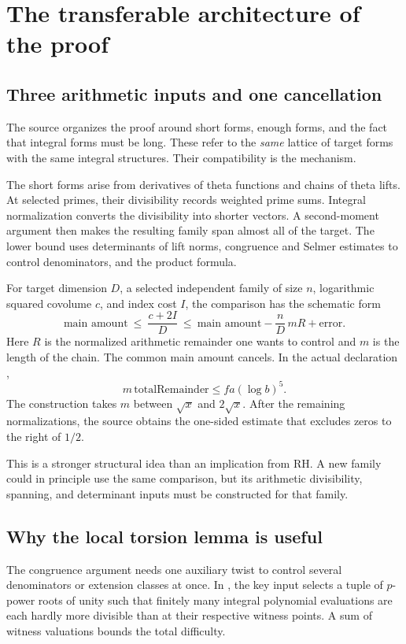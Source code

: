 \section{The transferable architecture of the proof}
\label{sec:method}

\subsection{Three arithmetic inputs and one cancellation}
The source  organizes the proof around short forms, enough forms, and the fact that integral forms must be long. These refer to the \emph{same} lattice of target forms with the same integral structures. Their compatibility is the mechanism.

The short forms arise from derivatives of theta functions and chains of theta lifts. At selected primes, their divisibility records weighted prime sums. Integral normalization converts the divisibility into shorter vectors. A second-moment argument then makes the resulting family span almost all of the target. The lower bound uses determinants of lift norms, congruence and Selmer estimates to control denominators, and the product formula.

For target dimension $D$, a selected independent family of size $n$, logarithmic squared covolume $c$, and index cost $I$, the comparison has the schematic form
\[
 \text{main amount}
 \ \le\ \frac{c+2I}{D}
 \ \le\ \text{main amount}-\frac nD\,mR+\text{error}.
\]
Here $R$ is the normalized arithmetic remainder one wants to control and $m$ is the length of the chain. The common main amount cancels. In the actual declaration
,
\[
 m\,\mathrm{totalRemainder}\le f a(\log b)^5.
\]
The construction takes $m$ between $\sqrt x$ and $2\sqrt x$. After the remaining normalizations, the source obtains the one-sided estimate that excludes zeros to the right of $1/2$.

This is a stronger structural idea than an implication from RH. A new family could in principle use the same comparison, but its arithmetic divisibility, spanning, and determinant inputs must be constructed for that family.

\subsection{Why the local torsion lemma is useful}
The congruence argument needs one auxiliary twist to control several denominators or extension classes at once. In
,
the key input selects a tuple of $p$-power roots of unity such that finitely many integral polynomial evaluations are each hardly more divisible than at their respective witness points. A sum of witness valuations bounds the total difficulty.

